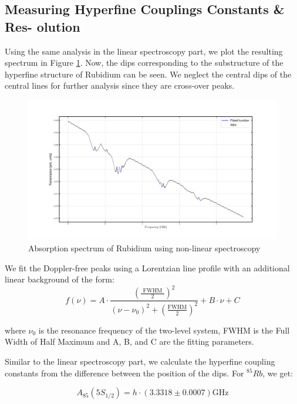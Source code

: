 \documentclass[12pt]{article}
\begin{document}
\subsection{Measuring Hyperfine Couplings Constants \& Res-
olution}

Using the same analysis in the linear spectroscopy part, we plot the resulting spectrum in Figure \ref{fig13}. Now, the dips corresponding to the substructure of the hyperfine structure of Rubidium can be seen. We neglect the central dips of the central lines for further analysis since they are cross-over peaks. 



\begin{figure}[H]
    \centering
    \includegraphics[width = \textwidth]{fig/dip_analysis.png}
    \caption{Absorption spectrum of Rubidium using non-linear spectroscopy}
    \label{fig13}
\end{figure}

We fit the Doppler-free peaks using a Lorentzian line profile with an additional linear background of the form:
\begin{equation}
f(\nu)=A \cdot \frac{\left(\frac{\text { FWHM }}{2}\right)^2}{\left(\nu-\nu_0\right)^2+\left(\frac{\mathrm{FWHM}}{2}\right)^2}+B \cdot \nu+C
\label{spectrumfit}
\end{equation}

where $\nu_0$ is the resonance frequency of the two-level system, FWHM is the Full Width of Half Maximum and A, B, and C are the fitting parameters.

Similar to the linear spectroscopy part, we calculate the hyperfine coupling constants from the difference between the position of the dips. For $^{85}Rb$, we get:

\begin{equation*}
A_{85}\left(5 S_{1 / 2}\right)=h \cdot(3.3318 \pm 0.0007) \mathrm{GHz}
\end{equation*}
\end{document}
